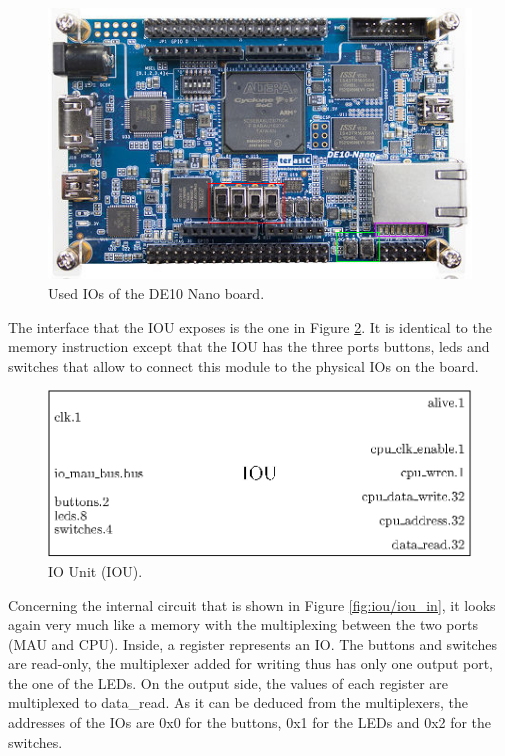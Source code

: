 \begin{figure}[H]
    \centering
    \includegraphics[scale=0.6]{Chapter3-CPU/res/ios.png}
    \caption{Used IOs of the DE10 Nano board.}
    \label{fig:iou/ios}
\end{figure}

The interface that the IOU exposes is the one in Figure \ref{fig:iou/iou}. It is identical to 
the memory instruction except that the IOU has the three ports buttons, leds and switches that 
allow to connect this module to the physical IOs on the board.

\begin{figure}[H]
    \centering
    \includegraphics[scale=0.8]{Chapter3-CPU/res/iou}
    \caption{IO Unit (IOU).}
    \label{fig:iou/iou}
\end{figure}

Concerning the internal circuit that is shown in Figure \ref{fig:iou/iou_in}, it looks again very 
much like a memory with the multiplexing between the two ports (MAU and CPU). Inside, a register 
represents an IO. The buttons and switches are read-only, the multiplexer added for writing thus has 
only one output port, the one of the LEDs. On the output side, the values of each register are 
multiplexed to data\_read. As it can be deduced from the multiplexers, the addresses of the IOs are 
0x0 for the buttons, 0x1 for the LEDs and 0x2 for the switches. 

